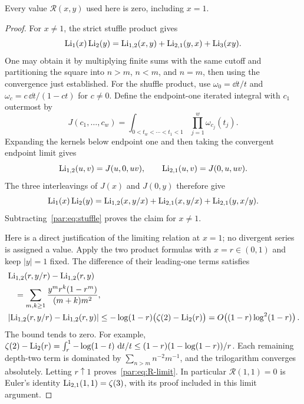 \begin{lemma}\label{par:lem:R}
Every value $\mathcal R(x,y)$ used here is zero, including $x=1$.
\end{lemma}

\begin{proof}
For $x\ne1$, the strict stuffle product gives
\begin{equation}\label{par:eq:stuffle}
 \operatorname{Li}_1(x)\operatorname{Li}_2(y)
 =\operatorname{Li}_{1,2}(x,y)+\operatorname{Li}_{2,1}(y,x)+\operatorname{Li}_3(xy).
\end{equation}
One may obtain it by multiplying finite sums with the same cutoff and
partitioning the square into $n>m$, $n<m$, and $n=m$, then using the
convergence just established.
For the shuffle product, use $\omega_0=\dd t/t$ and
$\omega_c=c\,\dd t/(1-ct)$ for $c\ne0$.
Define the endpoint-one iterated integral with $c_1$ outermost by
\[
 J(c_1,\ldots,c_w)=
 \int_{0<t_w<\cdots<t_1<1}\prod_{j=1}^w\omega_{c_j}(t_j).
\]
Expanding the kernels below endpoint one and then taking the convergent
endpoint limit gives
\[
 \operatorname{Li}_{1,2}(u,v)=J(u,0,uv),\qquad
 \operatorname{Li}_{2,1}(u,v)=J(0,u,uv).
\]
The three interleavings of $J(x)$ and $J(0,y)$ therefore give
\begin{equation}\label{par:eq:shuffle}
 \operatorname{Li}_1(x)\operatorname{Li}_2(y)
 =\operatorname{Li}_{1,2}(x,y/x)+\operatorname{Li}_{2,1}(x,y/x)
       +\operatorname{Li}_{2,1}(y,x/y).
\end{equation}
Subtracting~\eqref{par:eq:stuffle} proves the claim for $x\ne1$.

Here is a direct justification of the limiting relation at $x=1$;
no divergent series is assigned a value. Apply the two product formulas
with $x=r\in(0,1)$ and keep $|y|=1$ fixed. The difference of their
leading-one terms satisfies
\begin{align*}
 &\operatorname{Li}_{1,2}(r,y/r)-\operatorname{Li}_{1,2}(r,y)\\
 &\quad=\sum_{m,k\ge1}
       \frac{y^m r^k(1-r^m)}{(m+k)m^2},\\
 &\left|\operatorname{Li}_{1,2}(r,y/r)-\operatorname{Li}_{1,2}(r,y)\right|
 \le -\log(1-r)\bigl(\zeta(2)-\operatorname{Li}_2(r)\bigr)
 =O\!\left((1-r)\log^2(1-r)\right).
\end{align*}
The bound tends to zero. For example,
$\zeta(2)-\operatorname{Li}_2(r)=\int_r^1-\log(1-t)\,\,\mathrm d t/t
\le (1-r)(1-\log(1-r))/r$.
Each remaining depth-two term is dominated by
$\sum_{n>m}n^{-2}m^{-1}$, and the trilogarithm converges absolutely.
Letting $r\uparrow1$ proves~\eqref{par:eq:R-limit}.
In particular $\mathcal R(1,1)=0$ is Euler's identity
$\operatorname{Li}_{2,1}(1,1)=\zeta(3)$, with its proof included in this limit argument.
\end{proof}

